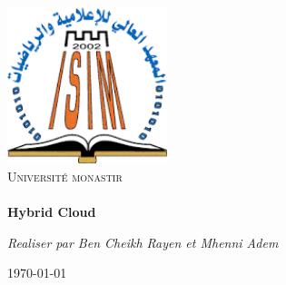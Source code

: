 \begin{titlepage}
\begin{center}

\includegraphics[width=0.35\textwidth]{./images}~\\[1cm]

\textsc{\LARGE Université  monastir}\\[1.5cm]

\textsc{\Large }\\[1cm]



{\huge \bfseries
Hybrid Cloud\\[0.4cm] }



\begin{minipage}{0.6\textwidth}
\begin{flushleft} \large
\emph{Realiser par Ben Cheikh Rayen et Mhenni Adem}\\

\end{flushleft}
\end{minipage}


\vfill

{\large \today}

\end{center}
\end{titlepage}